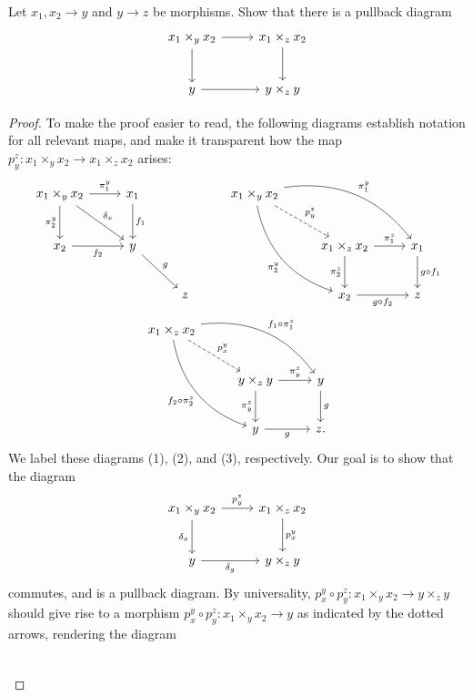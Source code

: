 \begin{exercise}
	Let $x_1,x_2\to y$ and $y\to z$ be morphisms. Show that there is a pullback diagram
	\[\begin{tikzcd}[row sep = 2.5em, column sep = 2.5em]
	x_1\times _yx_2\ar[r] \ar[d]  & x_1\times_zx_2\ar[d]  \\
	y\ar[r]  & y\times _zy
	\end{tikzcd}\]
\end{exercise}
\begin{proof}
	To make the proof easier to read, the following diagrams establish notation for all relevant maps, and make it transparent how the map $p_y^z : x_1\times _yx_2 \to x_1\times _zx_2$ arises:
	\[\begin{tikzcd}[row sep = 2.5em, column sep = 2.5em]
		x_1\times _yx_2\ar[" \delta _x ", dr] \ar[" \pi _1^y ", r] \ar[" \pi _2^y "', d]  & x_1 \ar[" f_1 ", d]  &  & x_1\times _yx_2 \ar[" \pi _1^y ", bend left, drr] \ar[" \pi _2^y "', bend right, ddr] \ar[" p_y^z ", dashed, dr]  &  &  \\
	x_2 \ar[" f_2 "', r]  & y \ar[" g ", dr]  &  &  & x_1\times _zx_2 \ar[" \pi _1^z ", r] \ar[" \pi _2^z "', d]  & x_1 \ar[" g\circ f_1 ", d]  \\
	 &  & z &  & x_2 \ar[" g\circ f_2 "', r]  & z
	\end{tikzcd}\]
	\[\begin{tikzcd}[row sep = 2.5em, column sep = 2.5em]
	x_1\times _zx_2 \ar[" f_1 \circ \pi _1^z ", bend left, drr] \ar[" f_2\circ \pi _2^z "', bend right, ddr]  \ar[" p_x^y ", dashed, dr] &  &  \\
	 & y\times _zy \ar[" \pi _y^z ", r] \ar[" \pi _y^z "', d]   & y\ar[" g ", d]  \\
	 & y\ar[" g "', r]  & z.
	\end{tikzcd}\]
	We label these diagrams (1), (2), and (3), respectively. Our goal is to show that the diagram
	\[\begin{tikzcd}[row sep = 2.5em, column sep = 2.5em]
	x_1\times _yx_2 \ar[" p_y^z ", r] \ar[" \delta _x "', d]  & x_1\times_zx_2\ar[" p_x^y ", d]  \\
	y \ar[" \delta_g "', r ]  & y\times _zy
	\end{tikzcd}\]
	commutes, and is a pullback diagram. By universality, $p_x^y \circ p_y^z : x_1\times _yx_2 \to y\times _zy$ should give rise to a morphism $p_x^y\circ p_y^z : x_1\times _yx_2 \to y$ as indicated by the dotted arrows, rendering the diagram
	\[\begin{tikzcd}[row sep = 2.5em, column sep = 2.5em]

\end{tikzcd}\]
\end{proof}
